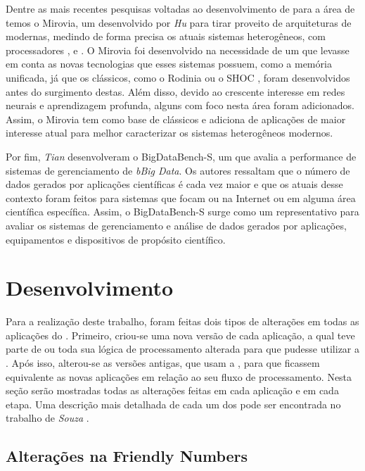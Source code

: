 Dentre as mais recentes pesquisas voltadas ao desenvolvimento de \benchs para a área de \HPC temos o Mirovia, um \bench desenvolvido por \textit{Hu} \etal \cite{miroviabenchmark} para tirar proveito de arquiteturas de \GPUs modernas, medindo de forma precisa os atuais sistemas heterogêneos, com processadores \multicore, \manycore e \GPUs. O Mirovia foi desenvolvido na necessidade de um \bench que levasse em conta as novas tecnologias que esses sistemas possuem, como a memória unificada, já que os \benchs clássicos, como o Rodinia \cite{rodiniabench} ou o SHOC \cite{shocbench}, foram desenvolvidos antes do surgimento destas. Além disso, devido ao crescente interesse em redes neurais e aprendizagem profunda, alguns  com foco nesta área foram adicionados. Assim, o Mirovia tem como base  de \benchs clássicos e adiciona  de aplicações de maior interesse atual para melhor caracterizar os sistemas heterogêneos modernos.

Por fim, \textit{Tian} \etal \cite{tianbench} desenvolveram o BigDataBench-S, um \bench que avalia a performance de sistemas de gerenciamento de \textit{bBig Data}. Os autores ressaltam que o número de dados gerados por aplicações científicas é cada vez maior e que os atuais \benchs desse contexto foram feitos para sistemas que focam ou na Internet ou em alguma área científica específica. Assim, o BigDataBench-S surge como um \bench representativo para avaliar os sistemas de gerenciamento e análise de dados gerados por aplicações, equipamentos e dispositivos de propósito científico.

\chapter{Desenvolvimento}
\label{ch:desenvolvimento}

Para a realização deste trabalho, foram feitas dois tipos de alterações em todas as aplicações do \capb. Primeiro, criou-se uma nova versão de cada aplicação, a qual teve parte de ou toda sua lógica de processamento alterada para que pudesse utilizar a \API \ASYNC. Após isso, alterou-se as versões antigas, que usam a \API \IPC, para que ficassem equivalente as novas aplicações em relação ao seu fluxo de processamento. Nesta seção serão mostradas todas as alterações feitas em cada aplicação e em cada etapa. Uma descrição mais detalhada de cada um dos  pode ser encontrada no trabalho de \textit{Souza} \etal \cite{Castro-Souza-CCPE:2016}.

\section{Alterações na Friendly Numbers}
\label{sec:alteracoesfn}

